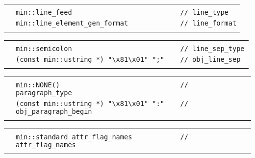 \documentclass[12pt]{article}
\newenvironment{indpar}[1][0.3in]%
	{\begin{list}{}%
		     {\setlength{\itemsep}{0in}%
		      \setlength{\topsep}{0in}%
		      \setlength{\parsep}{1ex}%
		      \setlength{\labelwidth}{#1}%
		      \setlength{\leftmargin}{#1}%
		      \addtolength{\leftmargin}{\labelsep}}%
	 \item}%
	{\end{list}}
\newlength{\ARGBREAKLENGTH}
\newcommand{\ARGBREAK}[1][\ARGBREAKLENGTH]{\\&\hspace*{#1}}
\begin{document}
\begin{indpar}[1em]
\vspace{-4ex}\begin{tabular}{r@{}l}\hspace*{0.1in}\ARGBREAK
\verb|min::line_feed                           // line_type|\ARGBREAK
\verb|min::line_element_gen_format             // line_format|\ARGBREAK
\end{tabular}

\vspace{-4ex}\begin{tabular}{r@{}l}\hspace*{0.1in}\ARGBREAK
\verb|min::semicolon                           // line_sep_type|\ARGBREAK
\verb|(const min::ustring *) "\x81\x01" ";"    // obj_line_sep|\ARGBREAK
\end{tabular}

\vspace{-4ex}\begin{tabular}{r@{}l}\hspace*{0.1in}\ARGBREAK
\verb|min::NONE()                              // paragraph_type|\ARGBREAK
\verb|(const min::ustring *) "\x81\x01" ":"    // obj_paragraph_begin|\ARGBREAK
\end{tabular}

\vspace{-4ex}\begin{tabular}{r@{}l}\hspace*{0.1in}\ARGBREAK
\verb|min::standard_attr_flag_names            // attr_flag_names|\ARGBREAK
\end{tabular}\end{indpar}
\end{document}
